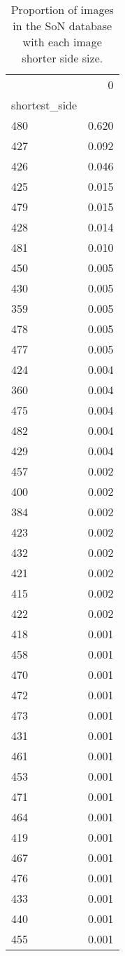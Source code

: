 \begin{table}
\caption{Proportion of images in the SoN database with each image shorter side size.}
\label{tab:SoNImageShortSize}
\begin{tabular}{lr}
\toprule
 & 0 \\
shortest_side &  \\
\midrule
480 & 0.620 \\
427 & 0.092 \\
426 & 0.046 \\
425 & 0.015 \\
479 & 0.015 \\
428 & 0.014 \\
481 & 0.010 \\
450 & 0.005 \\
430 & 0.005 \\
359 & 0.005 \\
478 & 0.005 \\
477 & 0.005 \\
424 & 0.004 \\
360 & 0.004 \\
475 & 0.004 \\
482 & 0.004 \\
429 & 0.004 \\
457 & 0.002 \\
400 & 0.002 \\
384 & 0.002 \\
423 & 0.002 \\
432 & 0.002 \\
421 & 0.002 \\
415 & 0.002 \\
422 & 0.002 \\
418 & 0.001 \\
458 & 0.001 \\
470 & 0.001 \\
472 & 0.001 \\
473 & 0.001 \\
431 & 0.001 \\
461 & 0.001 \\
453 & 0.001 \\
471 & 0.001 \\
464 & 0.001 \\
419 & 0.001 \\
467 & 0.001 \\
476 & 0.001 \\
433 & 0.001 \\
440 & 0.001 \\
455 & 0.001 \\

\end{tabular}
\end{table}
